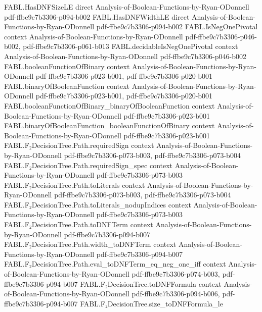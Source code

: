 \begin{theorem}
\proofstep
  {FABL.HasDNFSizeLE}
  {direct}
  {Analysis-of-Boolean-Functions-by-Ryan-ODonnell}
  {pdf-ffbe9c7b3306-p094-b002}
\proofstep
  {FABL.HasDNFWidthLE}
  {direct}
  {Analysis-of-Boolean-Functions-by-Ryan-ODonnell}
  {pdf-ffbe9c7b3306-p094-b002}
\proofstep
  {FABL.IsNegOnePivotal}
  {context}
  {Analysis-of-Boolean-Functions-by-Ryan-ODonnell}
  {pdf-ffbe9c7b3306-p046-b002,
    pdf-ffbe9c7b3306-p061-b013}
\proofstep
  {FABL.decidableIsNegOnePivotal}
  {context}
  {Analysis-of-Boolean-Functions-by-Ryan-ODonnell}
  {pdf-ffbe9c7b3306-p046-b002}
\proofstep
  {FABL.booleanFunctionOfBinary}
  {context}
  {Analysis-of-Boolean-Functions-by-Ryan-ODonnell}
  {pdf-ffbe9c7b3306-p023-b001,
    pdf-ffbe9c7b3306-p020-b001}
\proofstep
  {FABL.binaryOfBooleanFunction}
  {context}
  {Analysis-of-Boolean-Functions-by-Ryan-ODonnell}
  {pdf-ffbe9c7b3306-p023-b001,
    pdf-ffbe9c7b3306-p020-b001}
\proofstep
  {FABL.booleanFunctionOfBinary_binaryOfBooleanFunction}
  {context}
  {Analysis-of-Boolean-Functions-by-Ryan-ODonnell}
  {pdf-ffbe9c7b3306-p023-b001}
\proofstep
  {FABL.binaryOfBooleanFunction_booleanFunctionOfBinary}
  {context}
  {Analysis-of-Boolean-Functions-by-Ryan-ODonnell}
  {pdf-ffbe9c7b3306-p023-b001}
\proofstep
  {FABL.F₂DecisionTree.Path.requiredSign}
  {context}
  {Analysis-of-Boolean-Functions-by-Ryan-ODonnell}
  {pdf-ffbe9c7b3306-p073-b003,
    pdf-ffbe9c7b3306-p073-b004}
\proofstep
  {FABL.F₂DecisionTree.Path.requiredSign_spec}
  {context}
  {Analysis-of-Boolean-Functions-by-Ryan-ODonnell}
  {pdf-ffbe9c7b3306-p073-b003}
\proofstep
  {FABL.F₂DecisionTree.Path.toLiterals}
  {context}
  {Analysis-of-Boolean-Functions-by-Ryan-ODonnell}
  {pdf-ffbe9c7b3306-p073-b003,
    pdf-ffbe9c7b3306-p073-b004}
\proofstep
  {FABL.F₂DecisionTree.Path.toLiterals_nodupIndices}
  {context}
  {Analysis-of-Boolean-Functions-by-Ryan-ODonnell}
  {pdf-ffbe9c7b3306-p073-b003}
\proofstep
  {FABL.F₂DecisionTree.Path.toDNFTerm}
  {context}
  {Analysis-of-Boolean-Functions-by-Ryan-ODonnell}
  {pdf-ffbe9c7b3306-p094-b007}
\proofstep
  {FABL.F₂DecisionTree.Path.width_toDNFTerm}
  {context}
  {Analysis-of-Boolean-Functions-by-Ryan-ODonnell}
  {pdf-ffbe9c7b3306-p094-b007}
\proofstep
  {FABL.F₂DecisionTree.Path.eval_toDNFTerm_eq_neg_one_iff}
  {context}
  {Analysis-of-Boolean-Functions-by-Ryan-ODonnell}
  {pdf-ffbe9c7b3306-p074-b003,
    pdf-ffbe9c7b3306-p094-b007}
\proofstep
  {FABL.F₂DecisionTree.toDNFFormula}
  {context}
  {Analysis-of-Boolean-Functions-by-Ryan-ODonnell}
  {pdf-ffbe9c7b3306-p094-b006,
    pdf-ffbe9c7b3306-p094-b007}
\proofstep
  {FABL.F₂DecisionTree.size_toDNFFormula_le}

\end{theorem}
